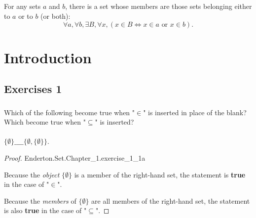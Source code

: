 \documentclass{report}
\begin{document}
\section{}%

For any sets $a$ and $b$, there is a set whose members are those sets belonging
  either to $a$ or to $b$ (or both):
  $$\forall a, \forall b, \exists B, \forall x,
      (x \in B \iff x \in a \text{ or } x \in b).$$

\begin{axiom}


\end{axiom}

\endgroup

\chapter{Introduction}%

\section{Exercises 1}%

\subsection{}%

Which of the following become true when "$\in$" is inserted in place of the
  blank?
Which become true when "$\subseteq$" is inserted?

\subsubsection{}%

$\{\emptyset\} \_\_\_\_ \{\emptyset, \{\emptyset\}\}$.

\begin{proof}

    {Enderton.Set.Chapter\_1.exercise\_1\_1a}

  Because the \textit{object} $\{\emptyset\}$ is a member of the right-hand set,
    the statement is \textbf{true} in the case of "$\in$".

  Because the \textit{members} of $\{\emptyset\}$ are all members of the
    right-hand set, the statement is also \textbf{true} in the case of
    "$\subseteq$".

\end{proof}
\end{document}
